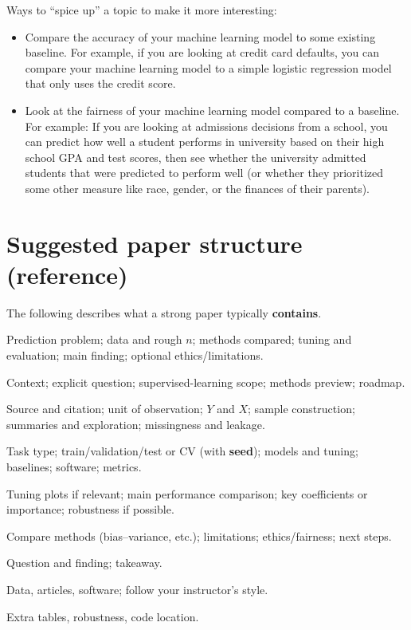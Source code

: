 \documentclass[11pt,letterpaper]{article}
\begin{document}
\medskip
\noindent Ways to ``spice up'' a topic to make it more interesting: 
\begin{itemize}
  \item Compare the accuracy of your machine learning model to some existing baseline. For example, if you are looking at credit card defaults, you can compare your machine learning model to a simple logistic regression model that only uses the credit score.
  \item Look at the fairness of your machine learning model compared to a baseline. For example: If you are looking at admissions decisions from a school, you can predict how well a student performs in university based on their high school GPA and test scores, then see whether the university admitted students that were predicted to perform well (or whether they prioritized some other measure like race, gender, or the finances of their parents). 
\end{itemize}


\section*{Suggested paper structure (reference)}

\noindent
The following describes what a strong paper typically \textbf{contains}. 

\begin{description}[style=nextline, leftmargin=0pt]
  \item[\textbf{Abstract} (often 150--250 words).]
  Prediction problem; data and rough $n$; methods compared; tuning and evaluation; main finding; optional ethics/limitations.

  \item[\textbf{Introduction.}]
  Context; explicit question; supervised-learning scope; methods preview; roadmap.

  \item[\textbf{Data.}]
  Source and citation; unit of observation; $Y$ and $X$; sample construction; summaries and exploration; missingness and leakage.

  \item[\textbf{Methods.}]
  Task type; train/validation/test or CV (with \textbf{seed}); models and tuning; baselines; software; metrics.

  \item[\textbf{Results.}]
  Tuning plots if relevant; main performance comparison; key coefficients or importance; robustness if possible.

  \item[\textbf{Discussion.}]
  Compare methods (bias--variance, etc.); limitations; ethics/fairness; next steps.

  \item[\textbf{Conclusion.}]
  Question and finding; takeaway.

  \item[\textbf{References.}]
  Data, articles, software; follow your instructor's style.

  \item[\textbf{Appendix} (optional).]
  Extra tables, robustness, code location.
\end{description}
\end{document}
